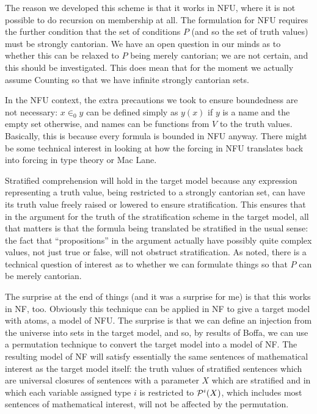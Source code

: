 \documentclass[12pt]{article}
\begin{document}
The reason we developed this scheme is that it works in NFU, where it is not possible to do recursion on membership at all.   The formulation for NFU requires
the further condition that the set of conditions $P$ (and so the set of truth values) must be strongly cantorian.  We have an open question in our minds as to whether this can be relaxed to $P$ being merely cantorian;  we are not certain, and this should be investigated.  This does mean that for the moment we actually assume
Counting so that we have infinite strongly cantorian sets.

In the NFU context, the extra precautions we took to ensure boundedness are not necessary:  $x \in_0 y$ can be defined simply as $y(x)$ if $y$ is a name
and the empty set otherwise, and names can be functions from $V$ to the truth values.  Basically, this is because every formula is bounded in NFU anyway.  There might be some technical interest in looking at how the forcing in NFU translates back into forcing in type theory or Mac Lane.

Stratified comprehension will hold in the target model because any expression representing a truth value, being restricted to a strongly cantorian set, can have its truth value freely raised or lowered to ensure stratification.  This ensures that in the argument for the truth of the stratification scheme in the target model, all that matters is that the formula being translated be stratified in the usual sense:  the fact that ``propositions'' in the argument actually have possibly quite complex values, not just true or false, will not obstruct stratification.   As noted, there is a technical question of interest as to whether we can formulate things so that $P$ can be merely cantorian.

The surprise at the end of things (and it was a surprise for me) is that this works in NF, too.  Obviously this technique can be applied in NF to give a target model with atoms, a model of NFU.  The surprise is that we can define an injection from the universe into sets in the target model, and so, by results of Boffa, we can use a permutation technique to convert the target model into a model of NF.  The resulting model of NF will satisfy essentially the same sentences of mathematical interest as the target model itself:  the truth values of stratified sentences which are universal closures of sentences with a parameter $X$ which are stratified and in which each variable assigned
type $i$ is restricted to ${\cal P}^i(X)$, which includes most sentences of mathematical interest, will not be affected by the permutation.
\end{document}
